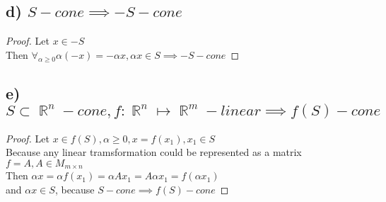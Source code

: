 \documentclass[12pt]{article}
\DeclareMathOperator{\R}{\mathbb{R}}
\begin{document}
\subsection*{d) \( S - cone \implies -S - cone\)}
\begin{proof}
    Let \(x \in -S\)\\
    Then \( \forall_{\alpha \geq 0} \alpha(-x)=-\alpha x, \alpha x \in S \implies -S -cone\)
\end{proof}
\subsection*{e) \( S \subset \R^n - cone, f:\R^n \mapsto \R^m -linear  \implies f(S)- cone\)}
\begin{proof}
    Let \(x \in f(S), \alpha \geq 0, x=f(x_1), x_1 \in S\)\\
    Because any linear tramsformation could be represented as a matrix  \(f=A, A \in M_{m \times n}\)\\
    Then \(\alpha x=\alpha f(x_1)=\alpha A x_1 =A \alpha x_1= f(\alpha x_1)\)\\
    and \(\alpha x \in S\), because \(S - cone \implies f(S)-cone\)
\end{proof}
    
\end{document}
